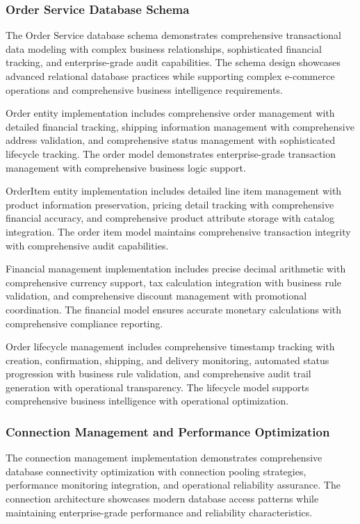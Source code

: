 \subsubsection{Order Service Database Schema}

The Order Service database schema demonstrates comprehensive transactional data modeling with complex business relationships, sophisticated financial tracking, and enterprise-grade audit capabilities. The schema design showcases advanced relational database practices while supporting complex e-commerce operations and comprehensive business intelligence requirements.

Order entity implementation includes comprehensive order management with detailed financial tracking, shipping information management with comprehensive address validation, and comprehensive status management with sophisticated lifecycle tracking. The order model demonstrates enterprise-grade transaction management with comprehensive business logic support.

OrderItem entity implementation includes detailed line item management with product information preservation, pricing detail tracking with comprehensive financial accuracy, and comprehensive product attribute storage with catalog integration. The order item model maintains comprehensive transaction integrity with comprehensive audit capabilities.

Financial management implementation includes precise decimal arithmetic with comprehensive currency support, tax calculation integration with business rule validation, and comprehensive discount management with promotional coordination. The financial model ensures accurate monetary calculations with comprehensive compliance reporting.

Order lifecycle management includes comprehensive timestamp tracking with creation, confirmation, shipping, and delivery monitoring, automated status progression with business rule validation, and comprehensive audit trail generation with operational transparency. The lifecycle model supports comprehensive business intelligence with operational optimization.

\subsubsection{Connection Management and Performance Optimization}

The connection management implementation demonstrates comprehensive database connectivity optimization with connection pooling strategies, performance monitoring integration, and operational reliability assurance. The connection architecture showcases modern database access patterns while maintaining enterprise-grade performance and reliability characteristics.


